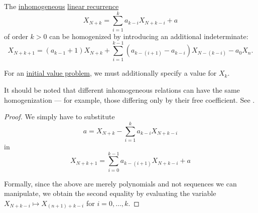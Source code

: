 \begin{proposition}\label{thm:linear_recurrence_relation_homogenization}
  The \hyperref[def:homogeneous_linear_recurrence]{inhomogeneous} \hyperref[def:linear_recurrence]{linear recurrence}
  \begin{equation*}
    X_{N+k}
    =
    \sum_{i=1}^k a_{k-i} X_{N+k-i} + a
  \end{equation*}
  of order \( k > 0 \) can be homogenized by introducing an additional indeterminate:
  \begin{equation}\label{eq:thm:linear_recurrence_relation_homogenization}
    X_{N+k+1}
    =
    (a_{k-1} + 1) X_{N+k} + \sum_{i=1}^{k-1} (a_{k-(i+1)} - a_{k-i}) X_{N-(k-i)} - a_0 X_n.
  \end{equation}

\end{proposition}
\begin{comments}
  \item For an \hyperref[def:recurrence_relation/initial]{initial value problem}, we must additionally specify a value for \( X_k \).

  \item It should be noted that different inhomogeneous relations can have the same homogenization --- for example, those differing only by their free coefficient. See .
\end{comments}
\begin{proof}
  We simply have to substitute
  \begin{equation*}
    a = X_{N+k} - \sum_{i=1}^k a_{k-i} X_{N+k-i}
  \end{equation*}
  in
  \begin{equation*}
    X_{N+k+1} = \sum_{i=0}^{k-1} a_{k-(i+1)} X_{N+k-i} + a
  \end{equation*}

  Formally, since the above are merely polynomials and not sequences we can manipulate, we obtain the second equality by evaluating the variable \( X_{N+k-i} \mapsto X_{(n+1)+k-i} \) for \( i = 0, \ldots, k \).
\end{proof}

